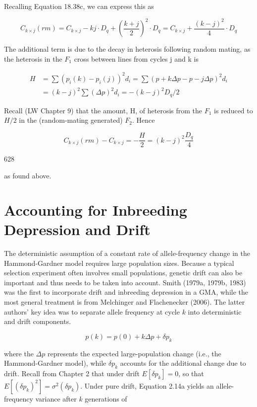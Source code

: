 \documentclass{article}
\begin{document}
Recalling Equation 18.38c, we can express this as

\begin{equation}
C_{k\times j}(r m)=C_{k\times j}-k j\cdot D_{q}+\left(\frac{k+j}{2}\right)^{2}\cdot D_{q}=C_{k\times j}+\frac{(k-j)^{2}}{4}\cdot D_{q}
\end{equation}

The additional term is due to the decay in heterosis following random mating, as the heterosis in the  $ F_{1} $ cross between lines from cycles j and k is

\begin{equation}
\begin{aligned}H&=\sum(p_{i}(k)-p_{i}(j))^{2}d_{i}=\sum(p+k\Delta p-p-j\Delta p)^{2}d_{i}\\&=(k-j)^{2}\sum(\Delta p)^{2}d_{i}=-(k-j)^{2}D_{q}/2\end{aligned}
\end{equation}

Recall (LW Chapter 9) that the amount, H, of heterosis from the  $ F_{1} $ is reduced to  $ H/2 $ in the (random-mating generated)  $ F_{2} $. Hence

\begin{equation}
C_{k\times j}(rm)-C_{k\times j}=-\frac{H}{2}=(k-j)^{2}\frac{D_{q}}{4}
\end{equation}

628

as found above.

\section{Accounting for Inbreeding Depression and Drift}
The deterministic assumption of a constant rate of allele-frequency change in the Hammond-Gardner model requires large population sizes. Because a typical selection experiment often involves small populations, genetic drift can also be important and thus needs to be taken into account. Smith (1979a, 1979b, 1983) was the first to incorporate drift and inbreeding depression in a GMA, while the most general treatment is from Melchinger and Flachenecker (2006). The latter authors' key idea was to separate allele frequency at cycle  $ k $ into deterministic and drift components.

\begin{equation}
p(k)=p(0)+k\Delta p+\delta p_{k}
\end{equation}

where the  $ \Delta p $ represents the expected large-population change (i.e., the Hammond-Gardner model), while  $ \delta p_k $ accounts for the additional change due to drift. Recall from Chapter 2 that under drift  $ E[\delta p_k] = 0 $, so that  $ E\left[(\delta p_k)^2\right] = \sigma^2(\delta p_k) $. Under pure drift, Equation 2.14a yields an allele-frequency variance after  $ k $ generations of
\end{document}
